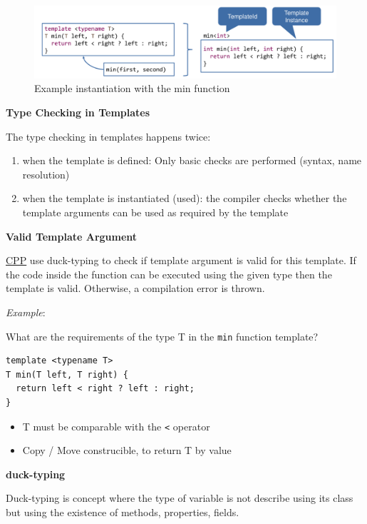 \documentclass[11pt,twoside,landscape]{article}
\begin{document}
\begin{multicols}{3}
{
\begin{figure}[htbp]
\centering
\includegraphics[width=.9\linewidth]{img/template_instantiation.png}
\caption{Example instantiation with the min function}
\end{figure}
}

\textbf{Type Checking in Templates}

The type checking in templates happens twice:
\begin{enumerate}
\item when the template is defined: Only basic checks are performed (syntax, name resolution)
\item when the template is instantiated (used): the compiler checks whether the template arguments can be used as required by the template
\end{enumerate}


\textbf{Valid Template Argument}

\href{../../../roam/20210920103243-c.org}{CPP} use duck-typing to check if template argument is valid for this template.
If the code inside the function can be executed using the given type then the template is valid.
Otherwise, a compilation error is thrown.

\emph{Example}: 

What are the requirements of the type T in the \texttt{min} function template?
\lstset{language=c++,label= ,caption= ,captionpos=b,numbers=none}
\begin{lstlisting}
template <typename T>
T min(T left, T right) {
  return left < right ? left : right;
}
\end{lstlisting}

\begin{itemize}
\item T must be comparable with the \texttt{<} operator
\item Copy / Move construcible, to return T by value
\end{itemize}


\textbf{duck-typing}

Duck-typing is concept where the type of variable is not describe using its class but using the existence of methods, properties, fields.


\end{multicols}
\end{document}
